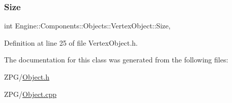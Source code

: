 \subsubsection{\texorpdfstring{Size}{Size}}
{\footnotesize\ttfamily int Engine\+::\+Components\+::\+Objects\+::\+Vertex\+Object\+::\+Size\hspace{0.3cm}{\ttfamily [protected]}, {\ttfamily [inherited]}}



Definition at line 25 of file Vertex\+Object.\+h.



The documentation for this class was generated from the following files\+:\begin{DoxyCompactItemize}
\item 
Z\+P\+G/\mbox{\hyperlink{Object_8h}{Object.\+h}}\item 
Z\+P\+G/\mbox{\hyperlink{Object_8cpp}{Object.\+cpp}}\end{DoxyCompactItemize}
